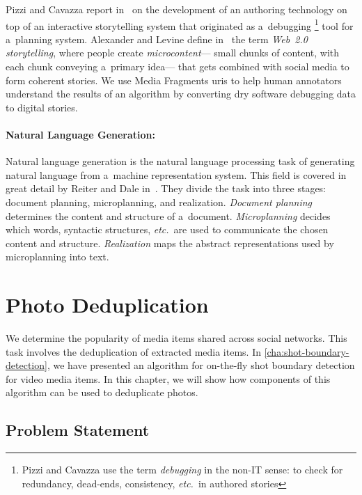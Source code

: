 Pizzi and Cavazza report in~\cite{pizzi2008debugging}
on the development of an authoring technology
on top of an interactive storytelling system
that originated as a~debugging%
\footnote{Pizzi and Cavazza use the term \emph{debugging}
in the non-IT sense: to check for redundancy, dead-ends, consistency, \emph{etc.}\ in
authored stories} tool for a~planning system.
Alexander and Levine define in~\cite{alexander2008storytelling}
the term \emph{Web~2.0 storytelling},
where people create \emph{microcontent}---%
small chunks of content, with each chunk conveying a~primary idea---%
that gets combined with social media to form coherent stories.
We use Media Fragments {\sc uri}s to help human annotators
understand the results of an algorithm
by converting dry software debugging data to digital stories.

\paragraph{Natural Language Generation:}

Natural language generation is the natural language processing task
of generating natural language from a~machine representation system.
This field is covered in great detail by Reiter and Dale
in~\cite{reiter2000building}.
They divide the task into three stages:
document planning, microplanning, and realization.
\emph{Document planning} determines the content and structure of a~document.
\emph{Microplanning} decides which words, syntactic structures,
\emph{etc.}\ are used to communicate the chosen content and structure.
\emph{Realization} maps the abstract representations
used by microplanning into text.

\section{Photo Deduplication}
\label{sec:photo-deduplication}

We determine the popularity of media items
shared across social networks.
This task involves the deduplication of extracted media items.
In \autoref{cha:shot-boundary-detection}, we have presented an algorithm
for on-the-fly shot boundary detection for video media items.
In this chapter, we will show how components of this algorithm
can be used to deduplicate photos.

\subsection{Problem Statement}
\label{sec:problem-statement}

